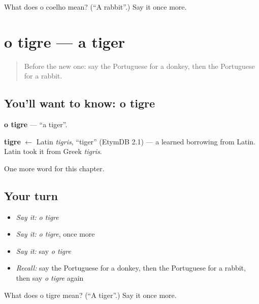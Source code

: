 \begin{tcolorbox}[breakable,colback=teal!4,colframe=teal!35!black,title={Before you move on}]
What does o coelho mean? (\textquotedblleft{}A rabbit\textquotedblright{}.) Say it once more.
\end{tcolorbox}
\section[o tigre]{o tigre — a tiger}

\label{lesson:PT-C118-tigre}



\begin{quote}
Before the new one: say the Portuguese for a donkey, then the Portuguese for a rabbit.
\end{quote}

\subsection*{You'll want to know: o tigre}
\textbf{o tigre} — \textquotedblleft{}a tiger\textquotedblright{}.

\begin{cousinweb}
\textbf{tigre} $\leftarrow$ Latin \emph{tigris}, \textquotedblleft{}tiger\textquotedblright{} (EtymDB 2.1) — a learned borrowing from Latin. Latin took it from Greek \emph{tigris}.
\end{cousinweb}

\begin{grammarlens}[title={What you've built}]
One more word for this chapter.
\end{grammarlens}

\subsection*{Your turn}
\begin{itemize}
\raggedright
  \item \emph{Say it:} \emph{o tigre}
  \item \emph{Say it:} \emph{o tigre}, once more
  \item \emph{Say it:} say \emph{o tigre}
  \item \emph{Recall:} say the Portuguese for a donkey, then the Portuguese for a rabbit, then say \emph{o tigre} again
\end{itemize}

\begin{tcolorbox}[breakable,colback=teal!4,colframe=teal!35!black,title={Before you move on}]
What does o tigre mean? (\textquotedblleft{}A tiger\textquotedblright{}.) Say it once more.
\end{tcolorbox}
